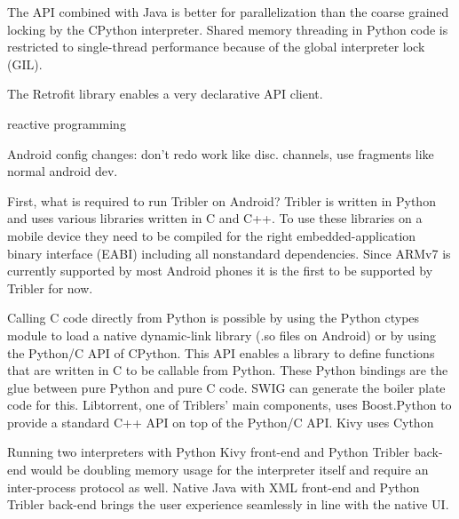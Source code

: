 The API combined with Java is better for parallelization than the coarse grained locking by the CPython interpreter.
Shared memory threading in Python code is restricted to single-thread performance because of the global interpreter lock (GIL).


The Retrofit library enables a very declarative API client.

reactive programming



Android config changes: don't redo work like disc. channels, use fragments like normal android dev.




First, what is required to run Tribler on Android?
Tribler is written in Python and uses various libraries written in C and C++.
To use these libraries on a mobile device they need to be compiled for the right embedded-application binary interface (EABI) including all nonstandard dependencies.
Since ARMv7 is currently supported by most Android phones it is the first to be supported by Tribler for now.


Calling C code directly from Python is possible by using the Python ctypes module to load a native dynamic-link library (.so files on Android) or by using the Python/C API of CPython.
This API enables a library to define functions that are written in C to be callable from Python.
These Python bindings are the glue between pure Python and pure C code.
SWIG can generate the boiler plate code for this.
Libtorrent, one of Triblers' main components, uses Boost.Python to provide a standard C++ API on top of the Python/C API.
Kivy uses Cython


Running two interpreters with Python Kivy front-end and Python Tribler back-end would be doubling memory usage for the interpreter itself and require an inter-process protocol as well.
Native Java with XML front-end and Python Tribler back-end brings the user experience seamlessly in line with the native UI.



